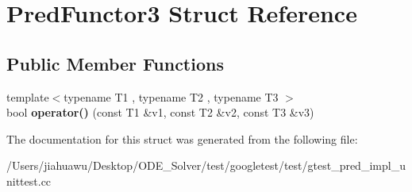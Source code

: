 \hypertarget{struct_pred_functor3}{}\section{Pred\+Functor3 Struct Reference}
\label{struct_pred_functor3}
\subsection*{Public Member Functions}
\begin{DoxyCompactItemize}
\item 
\mbox{\label{struct_pred_functor3_a08b0c59189570fb8eb7e2c7452fec995}} 
{\footnotesize template$<$typename T1 , typename T2 , typename T3 $>$ }\\bool {\bfseries operator()} (const T1 \&v1, const T2 \&v2, const T3 \&v3)
\end{DoxyCompactItemize}


The documentation for this struct was generated from the following file\+:\begin{DoxyCompactItemize}
\item 
/\+Users/jiahuawu/\+Desktop/\+O\+D\+E\+\_\+\+Solver/test/googletest/test/gtest\+\_\+pred\+\_\+impl\+\_\+unittest.\+cc\end{DoxyCompactItemize}
